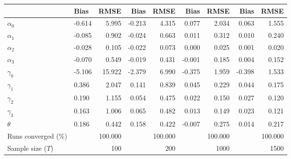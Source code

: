 
\begin{tabular}[t]{llrrrrrrr}
\toprule
  & Bias & RMSE & Bias & RMSE & Bias & RMSE & Bias & RMSE\\
\midrule
$\alpha_{0}$ & -0.614 & 5.995 & -0.213 & 4.315 & 0.077 & 2.034 & 0.063 & 1.555\\
$\alpha_{1}$ & -0.085 & 0.902 & -0.024 & 0.663 & 0.011 & 0.312 & 0.010 & 0.240\\
$\alpha_{2}$ & -0.028 & 0.105 & -0.022 & 0.073 & 0.000 & 0.025 & 0.001 & 0.020\\
$\alpha_{3}$ & -0.070 & 0.549 & -0.019 & 0.431 & -0.001 & 0.185 & 0.004 & 0.152\\
$\gamma_{0}$ & -5.106 & 15.922 & -2.379 & 6.990 & -0.375 & 1.959 & -0.398 & 1.533\\
$\gamma_{1}$ & 0.386 & 2.047 & 0.141 & 0.839 & 0.045 & 0.229 & 0.044 & 0.175\\
$\gamma_{2}$ & 0.190 & 1.155 & 0.054 & 0.475 & 0.022 & 0.150 & 0.027 & 0.120\\
$\gamma_{3}$ & 0.163 & 1.006 & 0.065 & 0.482 & 0.013 & 0.149 & 0.023 & 0.121\\
$\theta$ & 0.186 & 0.442 & 0.158 & 0.422 & -0.007 & 0.275 & 0.014 & 0.217\\
Runs converged (\%) &  & 100.000 &  & 100.000 &  & 100.000 &  & 100.000\\
Sample size ($T$) &  & 100 &  & 200 &  & 1000 &  & 1500\\
\bottomrule
\end{tabular}
